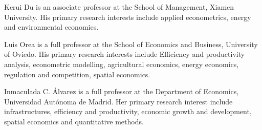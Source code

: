 %
%








\begin{aboutauthors}

Kerui Du is an associate professor at the School of Management, Xiamen University. His primary research interests include applied econometrics, energy and environmental economics.	

Luis Orea is a full professor at the School of Economics and Business, University of Oviedo. His primary research interests include Efficiency and productivity analysis, econometric modelling, agricultural economics, energy economics, regulation and competition, spatial economics. 

Inmaculada C. Álvarez is a full professor at the Department of Economics, Universidad Autónoma de Madrid. Her primary research interest include infrastructures, efficiency and productivity, economic growth and development, spatial economics and quantitative methods. 
	

	
\end{aboutauthors}


\endinput
